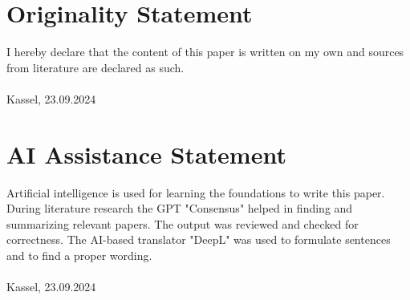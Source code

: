 \section{Originality Statement}
I hereby declare that the content of this paper is written on my own and sources from literature are declared as such.\vspace{2cm}\\
\underline{\hspace{10cm}}\\
\footnotesize Kassel, 23.09.2024 \normalsize
\section{AI Assistance Statement}
Artificial intelligence is used for learning the foundations to write this paper. During literature research the GPT "Consensus" helped in finding and summarizing relevant papers. The output was reviewed and checked for correctness. The AI-based translator "DeepL" was used to formulate sentences and to find a proper wording.\vspace{2cm}\\
\underline{\hspace{10cm}}\\
\footnotesize Kassel, 23.09.2024 \normalsize
